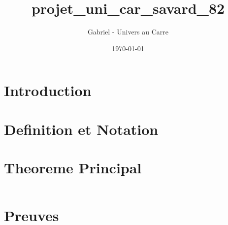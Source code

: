 \documentclass[12pt]{article}
\title{projet_uni_car_savard_82}
\author{Gabriel - Univers au Carre}
\date{\today}
\begin{document}
\maketitle


\section{Introduction}



\section{Definition et Notation}



\section{Theoreme Principal}


\begin{equation}
\end{equation}


\section{Preuves}


\end{document}
